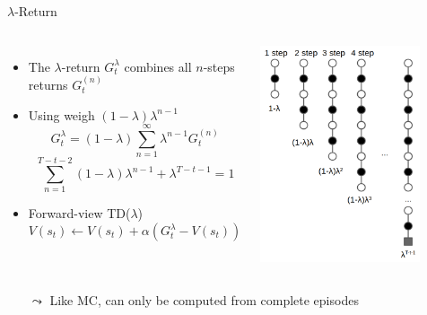 \begin{frame}[c]{$\lambda$-Return}
	
\begin{columns}
	
	
	\begin{itemize}
		\item The $\lambda$-return $G_t^ {\lambda}$ combines all $n$-steps returns $G_t^{(n)}$
		\item Using weigh $(1-\lambda) \lambda^{n-1}$
		$$G_t^\lambda = (1-\lambda) \sum_{n=1}^{\infty} \lambda^{n-1} G_t^{(n)} $$
		$$ \sum_{n=1}^{T-t-2} (1-\lambda) \lambda^{n-1} + \lambda^{T-t-1} = 1 $$
		\item Forward-view TD($\lambda$)
		$$V(s_t) \gets V(s_t) + \alpha \left(G_t^\lambda - V(s_t)\right) $$
	\end{itemize}


\includegraphics[width=0.8\textwidth]{images/td_lambda.png}
	
\end{columns}

\begin{itemize}
	\item[$\leadsto$] Like MC, can only be computed from complete episodes
\end{itemize}
	

	
\end{frame}

